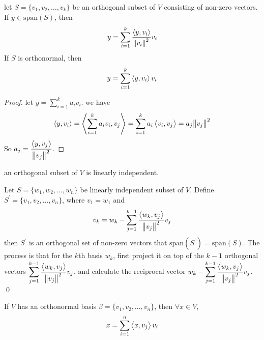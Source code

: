 \begin{theorem}
	let $S=\{ v_1, v_2, \dots, v_k \}$ be an orthogonal subset of $V$ consisting of non-zero vectors. If $y \in \text{span}(S)$, then
	\begin{equation}
		y = \sum_{i=1}^k \frac{\left\langle \displaystyle y, v_i \right\rangle}{\norm{v_i}^2} v_i
	\end{equation}
	If $S$ is orthonormal, then
	\begin{equation}
		y = \sum_{i=1}^k \left\langle \displaystyle y, v_i \right\rangle v_i
	\end{equation}
\end{theorem}
\begin{proof}
	let $\displaystyle y = \sum_{i=1}^k a_i v_i$. we have
	\begin{equation*}
		\left\langle \displaystyle y, v_i \right\rangle = \left\langle \displaystyle \sum_{i=1}^k a_i v_i, v_j \right\rangle = \sum_{i=1}^k a_i \left\langle \displaystyle v_i, v_j \right\rangle = a_j \norm{v_j}^2
	\end{equation*}
	So $\displaystyle a_j = \frac{\left\langle \displaystyle y, v_j \right\rangle}{\norm{v_j}^2}$.
	
	
\end{proof}

\begin{theorem}
	an orthogonal subset of $V$ is linearly independent.
\end{theorem}

\begin{definition}
	Let $S=\{w_1, w_2, \dots, w_n \}$ be linearly independent subset of $V$. Define $S^\prime=\{v_1,v_2,\dots,v_n  \}$, where $v_1=w_1$ and 
	\begin{equation}
		v_k = w_k - \sum_{j=1}^{k-1} \frac{\left\langle \displaystyle w_k, v_j \right\rangle}{\norm{v_j}^2} v_j
	\end{equation}
	then $S^\prime$ is an orthogonal set of non-zero vectors that $\text{span}(S^\prime) = \text{span}(S)$. The process is that for the $k$th basis $w_k$, first project it on top of the $k-1$ orthogonal vectors $\displaystyle \sum_{j=1}^{k-1} \frac{\left\langle \displaystyle w_k, v_j \right\rangle}{\norm{v_j}^2} v_j$, and calculate the reciprocal vector $\displaystyle w_k - \sum_{j=1}^{k-1} \frac{\left\langle \displaystyle w_k, v_j \right\rangle}{\norm{v_j}^2} v_j$.
	\qed
\end{definition}

\begin{theorem}\label{vectorinorthonormalbasis}
	If $V$ has an orthonormal basis $\beta=\{v_1,v_2,\dots,v_n\}$, then $\forall x\in V$, 
	\begin{equation}
		x = \sum_{i=1}^n \left\langle \displaystyle x, v_j \right\rangle v_i
	\end{equation}
\end{theorem}

